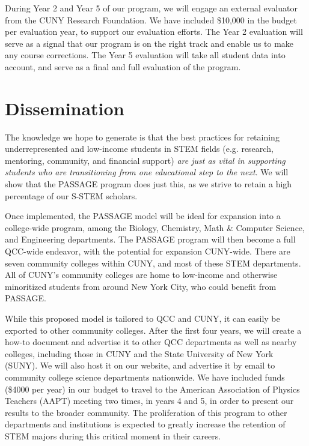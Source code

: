 \documentclass[12pt]{article}
\begin{document}
During Year 2 and Year 5 of our program, we will engage an external evaluator from the CUNY Research Foundation.  We have included \$10,000 in the budget per evaluation year, to support our evaluation efforts.  The Year 2 evaluation will serve as a signal that our program is on the right track and enable us to make any course corrections.  The Year 5 evaluation will take all student data into account, and serve as a final and full evaluation of the program.

\section{Dissemination}

The knowledge we hope to generate is that the best practices for retaining underrepresented and low-income students in STEM fields (e.g. research, mentoring, community, and financial support) {\em are just as vital in supporting students who are transitioning from one educational step to the next}.  We will show that the PASSAGE program does just this, as we strive to retain a high percentage of our S-STEM scholars.

Once implemented, the PASSAGE model will be ideal for expansion into a college-wide program, among the Biology, Chemistry, Math \& Computer Science, and Engineering departments.  The PASSAGE program will then become a full QCC-wide endeavor, with the potential for expansion CUNY-wide.  There are seven community colleges within CUNY, and most of these STEM departments.  All of CUNY's community colleges are home to low-income and otherwise minoritized students from around New York City, who could benefit from PASSAGE.

While this proposed model is tailored to QCC and CUNY, it can easily be exported to other community colleges.  After the first four years, we will create a how-to document and advertise it to other QCC departments as well as nearby colleges, including those in CUNY and the State University of New York (SUNY).  We will also host it on our website, and advertise it by email to community college science departments nationwide.  We have included funds (\$4000 per year) in our budget to travel to the American Association of Physics Teachers (AAPT) meeting two times, in years 4 and 5, in order to present our results to the broader community.  The proliferation of this program to other departments and institutions is expected to greatly increase the retention of STEM majors during this critical moment in their careers.
\end{document}
